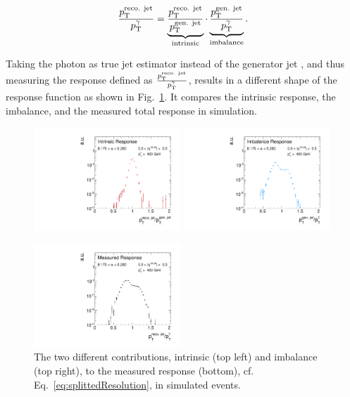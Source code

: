 \begin{equation}\label{eq:splittedResolution}
\frac{p_{\text{T}}^{\text{reco. jet}}}{p_{\text{T}}^{\gamma}} = \underbrace{\frac{p_{\text{T}}^{\text{reco. jet}}}{p_{\text{T}}^{\text{gen. jet}}}}_{\text{intrinsic}} \cdot \underbrace{\frac{p_{\text{T}}^{\text{gen. jet}}}{p_{\text{T}}^{\gamma}}}_{\text{imbalance}}.
\end{equation}

Taking the photon \pt as true jet \pt estimator instead of the generator jet \pt, and thus measuring the response defined as 
$\frac{p_{\text{T}}^{\text{reco. jet}}}{p_{\text{T}}^{\gamma}}$, results in a different shape
of the response function as shown in \mbox{Fig. \ref{fig:responseExamples}}. It compares the intrinsic response, the imbalance, and the measured total response in simulation. 

\begin{figure}[t]
 \centering
     \includegraphics[width=0.49\textwidth]{figures/resolution/methodology/intrinsicExample.pdf}
     \includegraphics[width=0.49\textwidth]{figures/resolution/methodology/imbalanceExample.pdf}

     \includegraphics[width=0.49\textwidth]{figures/resolution/methodology/fullResponseExample.pdf}
  \caption{The two different contributions, intrinsic (top left) and imbalance (top right), to the measured response (bottom), 
           cf. \mbox{Eq.~\eqref{eq:splittedResolution}}, in simulated events.}  
 \label{fig:responseExamples}
\end{figure}


